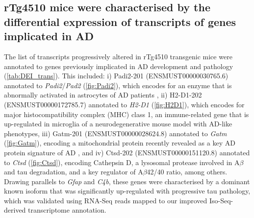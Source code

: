 \clearpage
\subsection{rTg4510 mice were characterised by the differential expression of transcripts of genes implicated in AD}
\label{ch5: diffisoexp}
The list of transcripts progressively altered in rTg4510 transgenic mice were annotated to genes previously implicated in AD development and pathology (\cref{tab:DEI_trans}). This included: i) Padi2-201 (ENSMUST00000030765.6) annotated to \textit{Padi2}/\textit{Pad2} (\cref{fig:Padi2}), which encodes for an enzyme that is abnormally activated in astrocytes of AD patients \cite{A2005}, ii) H2-D1-202 (ENSMUST00000172785.7) annotated to \textit{H2-D1} (\cref{fig:H2D1}), which encodes for major histocompatibility complex (MHC) class 1, an immune-related gene that is up-regulated in microglia of a neurodegenerative mouse model with AD-like phenotypes\cite{Mathys2017}, iii) Gatm-201 (ENSMUST00000028624.8) annotated to \textit{Gatm} (\cref{fig:Gatm}), encoding a mitochondrial protein recently revealed as a key AD protein signature of AD \cite{Wang2020}, and iv) Ctsd-202 (ENSMUST00000151120.8) annotated to \textit{Ctsd} (\cref{fig:Ctsd}), encoding Cathepsin D, a lysosomal protease involved in A$\beta$ \cite{JR1996} and tau \cite{A1997} degradation, and a key regulator of A$\beta$42/40 ratio\cite{Suire2020}, among others. Drawing parallels to \textit{Gfap} and \textit{C4b}, these genes were characterised by a dominant known isoform that was significantly up-regulated with progressive tau pathology, which was validated using RNA-Seq reads mapped to our improved Iso-Seq-derived transcriptome annotation. 


